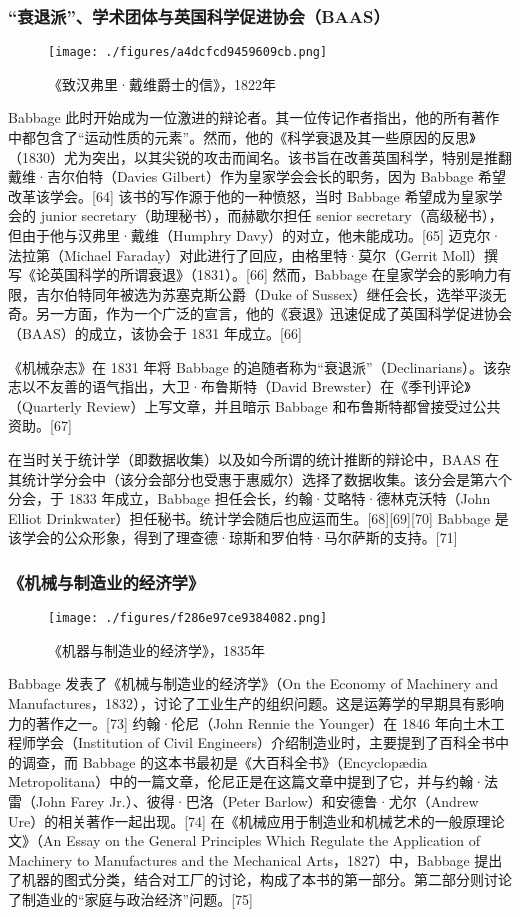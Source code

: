\subsubsection{“衰退派”、学术团体与英国科学促进协会（BAAS）}
\begin{figure}[ht]
\centering
\texttt{[image: ./figures/a4dcfcd9459609cb.png]}
\caption{《致汉弗里·戴维爵士的信》，1822年} \label{fig_CRSBQ_6}
\end{figure}
Babbage 此时开始成为一位激进的辩论者。其一位传记作者指出，他的所有著作中都包含了“运动性质的元素”。然而，他的《科学衰退及其一些原因的反思》（1830）尤为突出，以其尖锐的攻击而闻名。该书旨在改善英国科学，特别是推翻戴维·吉尔伯特（Davies Gilbert）作为皇家学会会长的职务，因为 Babbage 希望改革该学会。[64] 该书的写作源于他的一种愤怒，当时 Babbage 希望成为皇家学会的 junior secretary（助理秘书），而赫歇尔担任 senior secretary（高级秘书），但由于他与汉弗里·戴维（Humphry Davy）的对立，他未能成功。[65] 迈克尔·法拉第（Michael Faraday）对此进行了回应，由格里特·莫尔（Gerrit Moll）撰写《论英国科学的所谓衰退》（1831）。[66] 然而，Babbage 在皇家学会的影响力有限，吉尔伯特同年被选为苏塞克斯公爵（Duke of Sussex）继任会长，选举平淡无奇。另一方面，作为一个广泛的宣言，他的《衰退》迅速促成了英国科学促进协会（BAAS）的成立，该协会于 1831 年成立。[66]

《机械杂志》在 1831 年将 Babbage 的追随者称为“衰退派”（Declinarians）。该杂志以不友善的语气指出，大卫·布鲁斯特（David Brewster）在《季刊评论》（Quarterly Review）上写文章，并且暗示 Babbage 和布鲁斯特都曾接受过公共资助。[67]

在当时关于统计学（即数据收集）以及如今所谓的统计推断的辩论中，BAAS 在其统计学分会中（该分会部分也受惠于惠威尔）选择了数据收集。该分会是第六个分会，于 1833 年成立，Babbage 担任会长，约翰·艾略特·德林克沃特（John Elliot Drinkwater）担任秘书。统计学会随后也应运而生。[68][69][70] Babbage 是该学会的公众形象，得到了理查德·琼斯和罗伯特·马尔萨斯的支持。[71]
\subsubsection{《机械与制造业的经济学》}
\begin{figure}[ht]
\centering
\texttt{[image: ./figures/f286e97ce9384082.png]}
\caption{《机器与制造业的经济学》，1835年} \label{fig_CRSBQ_5}
\end{figure}
Babbage 发表了《机械与制造业的经济学》（On the Economy of Machinery and Manufactures，1832），讨论了工业生产的组织问题。这是运筹学的早期具有影响力的著作之一。[73] 约翰·伦尼（John Rennie the Younger）在 1846 年向土木工程师学会（Institution of Civil Engineers）介绍制造业时，主要提到了百科全书中的调查，而 Babbage 的这本书最初是《大百科全书》（Encyclopædia Metropolitana）中的一篇文章，伦尼正是在这篇文章中提到了它，并与约翰·法雷（John Farey Jr.）、彼得·巴洛（Peter Barlow）和安德鲁·尤尔（Andrew Ure）的相关著作一起出现。[74] 在《机械应用于制造业和机械艺术的一般原理论文》（An Essay on the General Principles Which Regulate the Application of Machinery to Manufactures and the Mechanical Arts，1827）中，Babbage 提出了机器的图式分类，结合对工厂的讨论，构成了本书的第一部分。第二部分则讨论了制造业的“家庭与政治经济”问题。[75]

